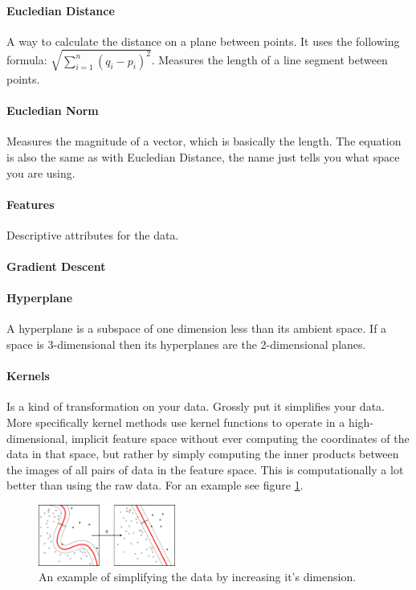\paragraph{Eucledian Distance}
A way to calculate the distance on a plane between points. It uses the following formula: $\sqrt{\sum\limits_{i=1}^n (q_{i} - p_{i})^2}$. Measures the length of a line segment between points.

\paragraph{Eucledian Norm}
Measures the magnitude of a vector, which is basically the length. The equation is also the same as with Eucledian Distance, the name just tells you what space you are using.

\paragraph{Features} 
Descriptive attributes for the data.

\paragraph{Gradient Descent}

\paragraph{Hyperplane}
A hyperplane is a subspace of one dimension less than its ambient space. If a space is 3-dimensional then its hyperplanes are the 2-dimensional planes.

\paragraph{Kernels} 
Is a kind of transformation on your data. Grossly put it simplifies your data. More specifically kernel methods use kernel functions to operate in a high-dimensional, implicit feature space without ever computing the coordinates of the data in that space, but rather by simply computing the inner products between the images of all pairs of data in the feature space. This is computationally a lot better than using the raw data. For an example see figure \ref{fig:kernelmethods}.
\begin{figure}
\centering
\includegraphics[width=0.4\textwidth]{images/kernelmethod.png}
\caption{\label{fig:kernelmethods} An example of simplifying the data by increasing it's dimension.}
\end{figure}

